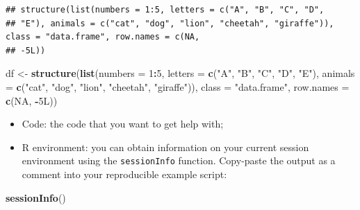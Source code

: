 \documentclass[
]{book}
\newenvironment{Shaded}{\begin{snugshade}}{\end{snugshade}}
\newcommand{\AttributeTok}[1]{\textcolor[rgb]{0.13,0.29,0.53}{#1}}
\newcommand{\ConstantTok}[1]{\textcolor[rgb]{0.56,0.35,0.01}{#1}}
\newcommand{\DecValTok}[1]{\textcolor[rgb]{0.00,0.00,0.81}{#1}}
\newcommand{\FunctionTok}[1]{\textcolor[rgb]{0.13,0.29,0.53}{\textbf{#1}}}
\newcommand{\NormalTok}[1]{#1}
\newcommand{\OtherTok}[1]{\textcolor[rgb]{0.56,0.35,0.01}{#1}}
\newcommand{\SpecialCharTok}[1]{\textcolor[rgb]{0.81,0.36,0.00}{\textbf{#1}}}
\newcommand{\StringTok}[1]{\textcolor[rgb]{0.31,0.60,0.02}{#1}}
\providecommand{\tightlist}{%
  \setlength{\itemsep}{0pt}\setlength{\parskip}{0pt}}
\begin{document}
\begin{verbatim}
## structure(list(numbers = 1:5, letters = c("A", "B", "C", "D", 
## "E"), animals = c("cat", "dog", "lion", "cheetah", "giraffe")), class = "data.frame", row.names = c(NA, 
## -5L))
\end{verbatim}

\begin{Shaded}
\begin{Highlighting}[]
\NormalTok{df }\OtherTok{\textless{}{-}} \FunctionTok{structure}\NormalTok{(}\FunctionTok{list}\NormalTok{(}\AttributeTok{numbers =} \DecValTok{1}\SpecialCharTok{:}\DecValTok{5}\NormalTok{, }
                     \AttributeTok{letters =} \FunctionTok{c}\NormalTok{(}\StringTok{"A"}\NormalTok{, }\StringTok{"B"}\NormalTok{, }\StringTok{"C"}\NormalTok{, }\StringTok{"D"}\NormalTok{, }\StringTok{"E"}\NormalTok{), }
                     \AttributeTok{animals =} \FunctionTok{c}\NormalTok{(}\StringTok{"cat"}\NormalTok{, }\StringTok{"dog"}\NormalTok{, }\StringTok{"lion"}\NormalTok{, }\StringTok{"cheetah"}\NormalTok{, }\StringTok{"giraffe"}\NormalTok{)), }
                \AttributeTok{class =} \StringTok{"data.frame"}\NormalTok{, }\AttributeTok{row.names =} \FunctionTok{c}\NormalTok{(}\ConstantTok{NA}\NormalTok{, }\SpecialCharTok{{-}}\NormalTok{5L))}
\end{Highlighting}
\end{Shaded}

\begin{itemize}
\tightlist
\item
  Code: the code that you want to get help with;
\item
  R environment: you can obtain information on your current session environment
  using the \texttt{sessionInfo} function. Copy-paste the output as a comment into your
  reproducible example script:
\end{itemize}

\begin{Shaded}
\begin{Highlighting}[]
\FunctionTok{sessionInfo}\NormalTok{()}
\end{Highlighting}
\end{Shaded}
\end{document}
